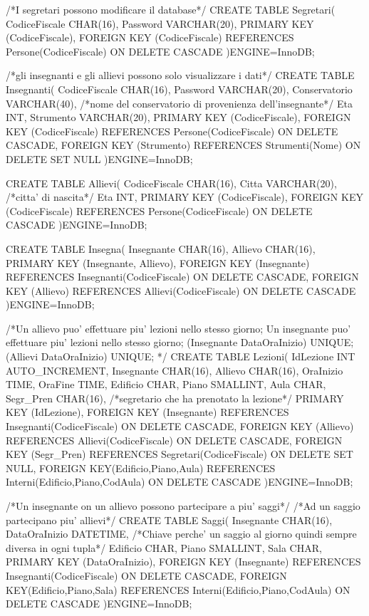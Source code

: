 \documentclass{article}
\begin{document}
\begin{small}
\begin{sql}
/*I segretari possono modificare il database*/
CREATE TABLE Segretari(
	CodiceFiscale CHAR(16),
	Password VARCHAR(20),
	PRIMARY KEY (CodiceFiscale),
	FOREIGN KEY (CodiceFiscale) REFERENCES Persone(CodiceFiscale) ON DELETE CASCADE
)ENGINE=InnoDB;

/*gli insegnanti e gli allievi possono solo visualizzare i dati*/
CREATE TABLE Insegnanti(
	CodiceFiscale CHAR(16),
	Password      VARCHAR(20),
	Conservatorio VARCHAR(40),    /*nome del conservatorio di provenienza dell'insegnante*/
	Eta INT,
	Strumento VARCHAR(20),
	PRIMARY KEY (CodiceFiscale),
	FOREIGN KEY (CodiceFiscale) REFERENCES Persone(CodiceFiscale) ON DELETE CASCADE,
	FOREIGN KEY (Strumento) REFERENCES Strumenti(Nome) ON DELETE SET NULL
)ENGINE=InnoDB;

CREATE TABLE Allievi(
	CodiceFiscale CHAR(16),
	Citta VARCHAR(20),       /*citta' di nascita*/
	Eta INT,
	PRIMARY KEY (CodiceFiscale),
	FOREIGN KEY (CodiceFiscale) REFERENCES Persone(CodiceFiscale) ON DELETE CASCADE
)ENGINE=InnoDB;

CREATE TABLE Insegna(
 	Insegnante CHAR(16),
	Allievo    CHAR(16),
	PRIMARY KEY (Insegnante, Allievo),
	FOREIGN KEY (Insegnante) REFERENCES Insegnanti(CodiceFiscale) ON DELETE CASCADE,
	FOREIGN KEY (Allievo) REFERENCES Allievi(CodiceFiscale) ON DELETE CASCADE
)ENGINE=InnoDB;



/*Un allievo puo' effettuare piu' lezioni nello stesso giorno;
  Un insegnante puo' effettuare piu' lezioni nello stesso giorno;
  (Insegnante DataOraInizio) UNIQUE;
  (Allievi    DataOraInizio) UNIQUE;
*/
CREATE TABLE Lezioni(
	IdLezione  INT AUTO_INCREMENT,
	Insegnante CHAR(16),
	Allievo    CHAR(16),
 	OraInizio  TIME,     
	OraFine    TIME, 	
	Edificio   CHAR,
	Piano	   SMALLINT,
	Aula       CHAR,	
	Segr_Pren  CHAR(16),	 /*segretario che ha prenotato la lezione*/	
	PRIMARY KEY (IdLezione),
	FOREIGN KEY (Insegnante) REFERENCES Insegnanti(CodiceFiscale) ON DELETE CASCADE,
	FOREIGN KEY (Allievo) REFERENCES Allievi(CodiceFiscale) ON DELETE CASCADE,
	FOREIGN KEY (Segr_Pren) REFERENCES Segretari(CodiceFiscale) ON DELETE SET NULL,
	FOREIGN KEY(Edificio,Piano,Aula) REFERENCES Interni(Edificio,Piano,CodAula) ON DELETE CASCADE
)ENGINE=InnoDB;

/*Un insegnante on un allievo possono partecipare a piu' saggi*/
/*Ad un saggio partecipano piu' allievi*/
CREATE TABLE Saggi(
	Insegnante CHAR(16),
	DataOraInizio DATETIME,	/*Chiave perche' un saggio al giorno quindi sempre diversa in ogni tupla*/
	Edificio CHAR,
	Piano	 SMALLINT,
	Sala 	 CHAR,
	PRIMARY KEY (DataOraInizio),
	FOREIGN KEY (Insegnante) REFERENCES Insegnanti(CodiceFiscale) ON DELETE CASCADE,
	FOREIGN KEY(Edificio,Piano,Sala) REFERENCES Interni(Edificio,Piano,CodAula) ON DELETE CASCADE
)ENGINE=InnoDB;




\end{sql}
\end{small}
\end{document}
